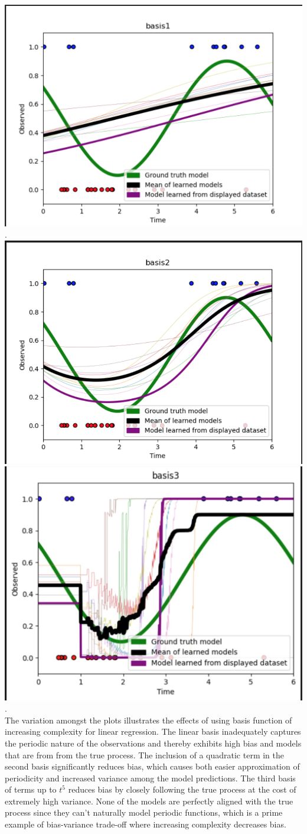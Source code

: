 \documentclass[submit]{harvardml}
\begin{document}
\pagebreak
 \includegraphics[width=0.5\linewidth]{hw2/base1.png}. \includegraphics[width=0.5\linewidth]{hw2/base2.png} \includegraphics[width=0.5\linewidth]{hw2/base3.png}.
\\\indent The variation amongst the plots illustrates the effects of using basis function of increasing complexity for linear regression. The linear basis inadequately captures the periodic nature of the observations and thereby exhibits high bias and models that are from from the true process. The inclusion of a quadratic term in the second basis significantly reduces bias, which causes both easier approximation of periodicity and increased variance among the model predictions. The third basis of terms up to $t^5$ reduces bias by closely following the true process at the cost of extremely high variance. None of the models are perfectly aligned with the true process since they can't naturally model periodic functions, which is a prime example of bias-variance trade-off where increasing complexity decreases bias. 
\\
\end{document}
